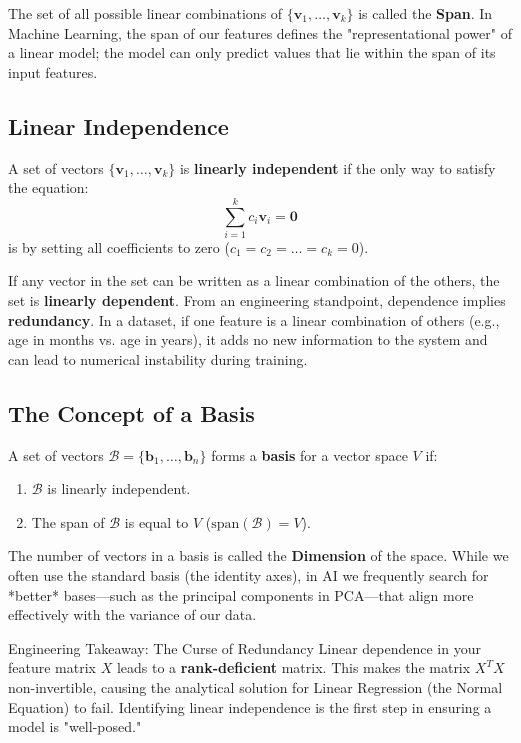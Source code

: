 \documentclass[12pt,a4paper,twoside,openright]{book}
\begin{document}
The set of all possible linear combinations of $\{\mathbf{v}_1, \dots, \mathbf{v}_k\}$ is called the \textbf{Span}. In Machine Learning, the span of our features defines the "representational power" of a linear model; the model can only predict values that lie within the span of its input features.



\subsection{Linear Independence}
A set of vectors $\{\mathbf{v}_1, \dots, \mathbf{v}_k\}$ is \textbf{linearly independent} if the only way to satisfy the equation:
\begin{equation}
    \sum_{i=1}^k c_i\mathbf{v}_i = \mathbf{0}
\end{equation}
is by setting all coefficients to zero ($c_1 = c_2 = \dots = c_k = 0$). 

If any vector in the set can be written as a linear combination of the others, the set is \textbf{linearly dependent}. From an engineering standpoint, dependence implies \textbf{redundancy}. In a dataset, if one feature is a linear combination of others (e.g., age in months vs. age in years), it adds no new information to the system and can lead to numerical instability during training.



\subsection{The Concept of a Basis}
A set of vectors $\mathcal{B} = \{\mathbf{b}_1, \dots, \mathbf{b}_n\}$ forms a \textbf{basis} for a vector space $V$ if:
\begin{enumerate}
    \item $\mathcal{B}$ is linearly independent.
    \item The span of $\mathcal{B}$ is equal to $V$ ($\text{span}(\mathcal{B}) = V$).
\end{enumerate}

The number of vectors in a basis is called the \textbf{Dimension} of the space. While we often use the standard basis (the identity axes), in AI we frequently search for *better* bases—such as the principal components in PCA—that align more effectively with the variance of our data.

\begin{unibobox}{Engineering Takeaway: The Curse of Redundancy}
    Linear dependence in your feature matrix $X$ leads to a \textbf{rank-deficient} matrix. This makes the matrix $X^TX$ non-invertible, causing the analytical solution for Linear Regression (the Normal Equation) to fail. Identifying linear independence is the first step in ensuring a model is "well-posed."
\end{unibobox}
\end{document}
